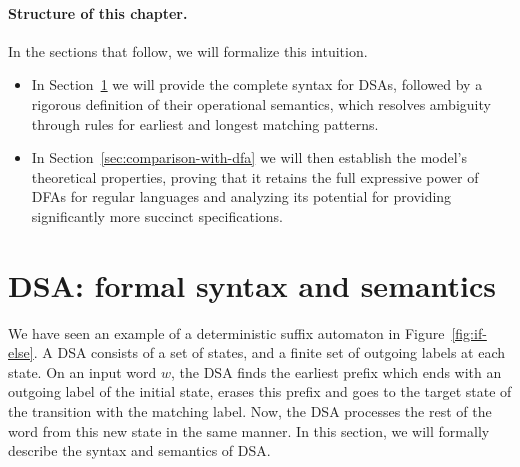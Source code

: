 \paragraph*{Structure of this chapter.} In the sections that follow, we will formalize this intuition. 
\begin{itemize}
\item In Section~\ref{sec:dsa-formal-syntax-semantics} we will provide the complete syntax for DSAs, followed by a rigorous definition of their operational semantics, which resolves ambiguity through rules for earliest and longest matching patterns. 
\item In Section~\ref{sec:comparison-with-dfa} we will then establish the model's theoretical properties, proving that it retains the full expressive power of DFAs for regular languages and analyzing its potential for providing significantly more succinct specifications.
\end{itemize}


\section{DSA: formal syntax and semantics}
\label{sec:dsa-formal-syntax-semantics}

We have seen an example of a deterministic suffix automaton in
Figure~\ref{fig:if-else}. A DSA consists of a set of states, and a
finite set of outgoing labels at each state. On an input word $w$, the
DSA finds the earliest prefix which ends with an outgoing label of the
initial state, erases this prefix and goes to the target state of the
transition with the matching label. Now, the DSA processes the rest of
the word from this new state in the same manner. In this section, we
will formally describe the syntax and semantics of DSA.

